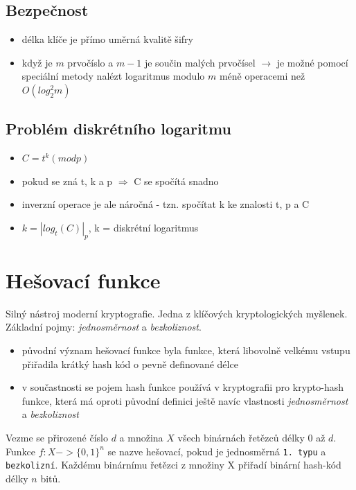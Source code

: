 \documentclass{szzclass}
\begin{document}
\subsection{Bezpečnost}
\begin{itemize}
    \item délka klíče je přímo uměrná kvalitě šifry
    \item když je $m$ prvočíslo a $m-1$ je součin malých prvočísel $\rightarrow$ je možné pomocí speciální metody nalézt logaritmus modulo $m$ méně operacemi než $O(log^2_2m)$
\end{itemize}
\subsection{Problém diskrétního logaritmu}
\begin{itemize}
    \item $C = t^k (mod p)$
    \item pokud se zná t, k a p $\Rightarrow$ C se spočítá snadno
    \item inverzní operace je ale náročná - tzn. spočítat k ke znalosti t, p a C
    \item $k = |log_t(C)|_p$, k = diskrétní logaritmus
\end{itemize}
\section{Hešovací funkce}
Silný nástroj moderní kryptografie. Jedna z klíčových kryptologických myšlenek. Základní pojmy: \textit{jednosměrnost} a \textit{bezkoliznost}.
\newline
\begin{itemize}
    \item původní význam hešovací funkce byla funkce, která libovolně velkému vstupu přiřadila krátký hash kód o pevně definované délce
    \item v součastnosti se pojem hash funkce používá v kryptografii pro krypto-hash funkce, která má oproti původní definici ještě navíc vlastnosti \textit{jednosměrnost} a \textit{bezkoliznost}
\end{itemize}
Vezme se přirozené číslo $d$ a množina $X$ všech binárnách řetězců délky 0 až $d$. Funkce $f: X -> \{0, 1\}^n$ se nazve hešovací,
pokud je jednosměrná \texttt{1. typu} a \texttt{bezkolizní}. Každému binárnímu řetězci z množiny X přiřadí binární hash-kód délky $n$ bitů.
\end{document}
